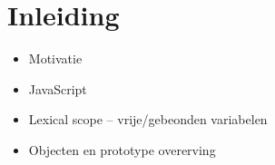 
\chapter{Inleiding}

\begin{itemize}
	\item Motivatie
	\item JavaScript
	\item Lexical scope -- vrije/gebeonden variabelen
	\item Objecten en prototype overerving
\end{itemize}
